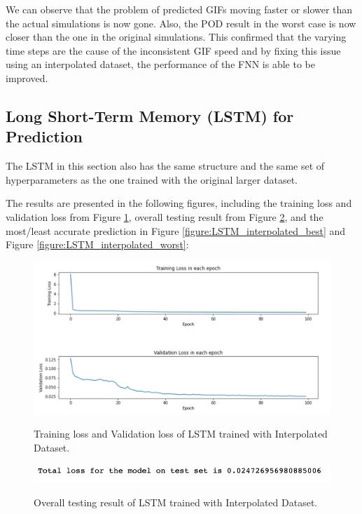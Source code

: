 We can observe that the problem of predicted GIFs moving faster or slower than the actual simulations is now gone. Also, the POD result in the worst case is now closer than the one in the original simulations. This confirmed that the varying time steps are the cause of the inconsistent GIF speed and by fixing this issue using an interpolated dataset, the performance of the FNN is able to be improved.


\subsection{Long Short-Term Memory (LSTM) for Prediction}

The LSTM in this section also has the same structure and the same set of hyperparameters as the one trained with the original larger dataset.

The results are presented in the following figures, including the training loss and validation loss from Figure \ref{figure:LSTM_interpolated_losses}, overall testing result from Figure \ref{figure:LSTM_interpolated_testing}, and the most/least accurate prediction in Figure \ref{figure:LSTM_interpolated_best} and Figure \ref{figure:LSTM_interpolated_worst}:


\begin{figure}[H]
    \caption{Training loss and Validation loss of LSTM trained with Interpolated Dataset.}
    \includegraphics[scale=0.6]{figures/mantle_convection_images/larger_dataset_interpolated/LSTM_trainingData.png}
    \label{figure:LSTM_interpolated_losses}
\end{figure}

\begin{figure}[H]
    \caption{Overall testing result of LSTM trained with Interpolated Dataset.}
    \includegraphics[scale=0.8]{figures/mantle_convection_images/larger_dataset_interpolated/LSTM_OverallTesting.png}
    \label{figure:LSTM_interpolated_testing}
\end{figure}

